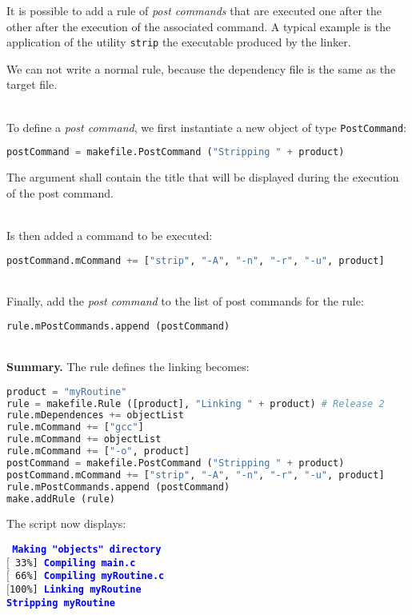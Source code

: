 \documentclass[a4paper,11pt]{extarticle}
\begin{document}
It is possible to add a rule of \emph{post commands} that are executed one after the other after the execution of the associated command. A typical example is the application of the utility \texttt{strip} the executable produced by the linker.

We can not write a normal rule, because the dependency file is the same as the target file.

~\\To define a \emph{post command}, we first instantiate a new object of type \texttt{PostCommand}:
\begin{lstlisting}[language=py]
postCommand = makefile.PostCommand ("Stripping " + product)
\end{lstlisting}
The argument shall contain the title that will be displayed during the execution of the post command.

~\\Is then added a command to be executed:
\begin{lstlisting}[language=py]
postCommand.mCommand += ["strip", "-A", "-n", "-r", "-u", product]
\end{lstlisting}

~\\Finally, add the \emph{post command} to the list of post commands for the rule:
\begin{lstlisting}[language=py]
rule.mPostCommands.append (postCommand)
\end{lstlisting}


~\\{\bf Summary.} The rule defines the linking becomes:
\begin{lstlisting}[language=py]
product = "myRoutine"
rule = makefile.Rule ([product], "Linking " + product) # Release 2
rule.mDependences += objectList
rule.mCommand += ["gcc"]
rule.mCommand += objectList
rule.mCommand += ["-o", product]
postCommand = makefile.PostCommand ("Stripping " + product)
postCommand.mCommand += ["strip", "-A", "-n", "-r", "-u", product]
rule.mPostCommands.append (postCommand)
make.addRule (rule)
\end{lstlisting}

The script now displays:

\begin{mdframed}[hidealllines=true,backgroundcolor=lightgray!20]
\tt\footnotesize
\textcolor{blue}{\bf Making "objects" directory}\\
$[$~33\%]~\textcolor{blue}{\bf Compiling main.c}\\
$[$~66\%]~\textcolor{blue}{\bf Compiling myRoutine.c}\\
$[$100\%]~\textcolor{blue}{\bf Linking myRoutine}\\
\textcolor{blue}{\bf Stripping myRoutine}
\end{mdframed}
\end{document}
